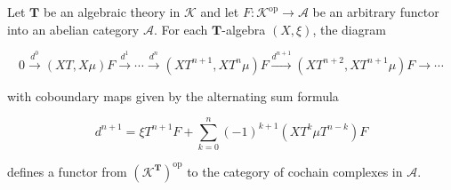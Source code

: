 Let $\mathbf{T}$ be an algebraic theory in $\mathcal{K}$ and let $F: \mathcal{K}^{\text{op}} \rightarrow \mathcal{A}$ be an arbitrary functor into an abelian category $\mathcal{A}$. For each $\mathbf{T}$-algebra $(X, \xi)$, the diagram

$$0 \xrightarrow{d^0} (XT, X\mu)F \xrightarrow{d^1} \cdots \xrightarrow{d^n} (XT^{n+1}, XT^n \mu)F \xrightarrow{d^{n+1}} (XT^{n+2}, XT^{n+1} \mu)F \rightarrow \cdots$$

with coboundary maps given by the alternating sum formula

$$d^{n+1} = \xi T^{n+1} F + \sum_{k=0}^{n} (-1)^{k+1} (XT^k \mu T^{n-k}) F$$

defines a functor from $(\mathcal{K}^{\mathbf{T}})^{\text{op}}$ to the category of cochain complexes in $\mathcal{A}$.
